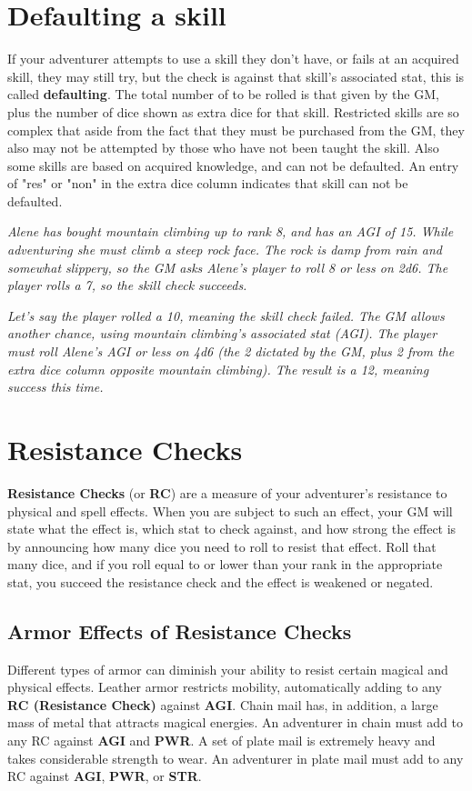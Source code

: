 \begin{multicols*}{2}
\section{Defaulting a skill}
If your adventurer attempts to use a skill they don't have, or fails at an acquired skill, they may still try, but the check is against that skill's associated stat, this is called \textbf{defaulting}. The total number of  to be rolled is that given by the GM, plus the number of dice shown as extra dice for that skill. Restricted skills are so complex that aside from the fact that they must be purchased from the GM, they also may not be attempted by those who have not been taught the skill. Also some skills are based on acquired knowledge, and can not be defaulted. An entry of "res" or "non" in the extra dice column indicates that skill can not be defaulted.

\textit{Alene has bought mountain climbing up to rank 8, and has an AGI of 15. While adventuring she must climb a steep rock face. The rock is damp from rain and somewhat
slippery, so the GM asks Alene's player to roll 8 or less on 2d6. The player rolls a 7, so the skill check succeeds.}

\textit{Let's say the player rolled a 10, meaning the skill check failed. The GM allows another chance, using mountain climbing's associated stat (AGI). The player must roll Alene's AGI or less on 4d6 (the 2 dictated by the GM, plus 2 from the extra dice column opposite mountain climbing). The result is a 12, meaning success this time.}
\section{Resistance Checks}
\textbf{Resistance Checks} (or \textbf{RC}) are a measure of your adventurer's resistance to physical and spell effects. When you are subject to such an effect, your GM will state what the effect is, which stat to check against, and how strong the effect is by announcing how many dice you need to roll to resist that effect. Roll that many dice, and if you roll equal to or lower than your rank in the appropriate stat, you succeed the resistance check and the effect is weakened or negated.
\subsection{Armor Effects of Resistance Checks}
Different types of armor can diminish your ability to resist certain magical and physical effects. Leather armor restricts mobility, automatically adding  to any \textbf{RC (Resistance Check)} against \textbf{AGI}. Chain mail has, in addition, a large mass of metal that attracts magical energies. An adventurer in chain must add  to any RC against \textbf{AGI} and \textbf{PWR}. A set of plate mail is extremely heavy and takes considerable strength to wear. An adventurer in plate mail must add  to any RC against \textbf{AGI}, \textbf{PWR}, or \textbf{STR}.

\end{multicols*}
